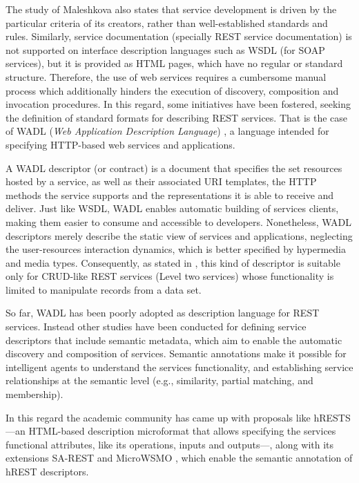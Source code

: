 The study of Maleshkova also states that service development is driven by the particular criteria of its creators, rather than well-established standards and rules. Similarly, service documentation (specially REST service documentation) is not supported on interface description languages such as WSDL (for SOAP services), but it is provided as HTML pages, which have no regular or standard structure. Therefore, the use of web services requires a cumbersome manual process which additionally hinders the execution of discovery, composition and invocation procedures. In this regard, some initiatives have been fostered, seeking the definition of standard formats for describing REST services. That is the case of WADL (\emph{Web Application Description Language}) \cite{W3C:2009}, a language intended for specifying HTTP-based web services and applications.

A WADL descriptor (or contract) is a document that specifies the set resources hosted by a service, as well as their associated URI templates, the HTTP methods the service supports and the representations it is able to receive and deliver. Just like WSDL, WADL enables automatic building of services clients, making them easier to consume and accessible to developers. Nonetheless, WADL descriptors merely describe the static view of services and applications, neglecting the user-resources interaction dynamics, which is better specified by hypermedia and media types. Consequently, as stated in \cite{Webber:2010b}, this kind of descriptor is suitable only for CRUD-like REST services (Level two services) whose functionality is limited to manipulate records from a data set.

So far, WADL has been poorly adopted as description language for REST services. Instead other studies have been conducted for defining service descriptors that include semantic metadata, which aim to enable the automatic discovery and composition of services. Semantic annotations make it possible for intelligent agents to understand the services functionality, and establishing service relationships at the semantic level (e.g., similarity, partial matching, and membership\cite{Paolucci:2002}).

In this regard the academic community has came up with proposals like hRESTS \cite{Kopecky:2008}---an HTML-based description microformat that allows specifying the services functional attributes, like its operations, inputs and outputs---, along with its extensions SA-REST \cite{Sheth:2007} and MicroWSMO \cite{Kopecky:2009}, which enable the semantic annotation of hREST descriptors.

